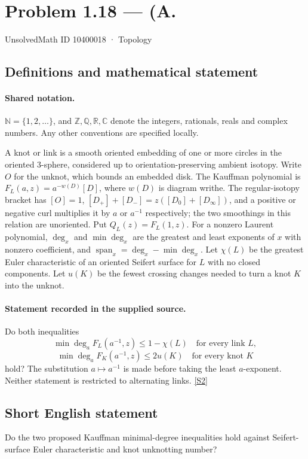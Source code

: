 \documentclass[11pt]{article}
\newcommand{\sref}[2]{\hyperlink{source:#1:#2}{[S#2]}}
\begin{document}
\setcounter{section}{10400017}
\section{Problem 1.18 — (A.}\label{10400018}
{\small\sffamily UnsolvedMath ID 10400018 · Topology}
\subsection{Definitions and mathematical statement}

\paragraph{Shared notation.}$\mathbb N=\{1,2,\ldots\}$, and $\mathbb Z,\mathbb Q,\mathbb R,\mathbb C$ denote the integers, rationals, reals and complex numbers. Any other conventions are specified locally.


A knot or link is a smooth oriented embedding of one or more circles in the oriented $3$-sphere, considered up to orientation-preserving ambient isotopy. Write $O$ for the unknot, which bounds an embedded disk. The Kauffman polynomial is $F_L(a,z)=a^{-w(D)}[D]$, where $w(D)$ is diagram writhe. The regular-isotopy bracket has $[O]=1$, $[D_+]+[D_-]=z([D_0]+[D_\infty])$, and a positive or negative curl multiplies it by $a$ or $a^{-1}$ respectively; the two smoothings in this relation are unoriented. Put $Q_L(z)=F_L(1,z)$. For a nonzero Laurent polynomial, $\deg_x$ and $\min\deg_x$ are the greatest and least exponents of $x$ with nonzero coefficient, and $\operatorname{span}_x=\deg_x-\min\deg_x$. Let $\chi(L)$ be the greatest Euler characteristic of an oriented Seifert surface for $L$ with no closed components. Let $u(K)$ be the fewest crossing changes needed to turn a knot $K$ into the unknot.
\paragraph{Statement recorded in the supplied source.}
Do both inequalities
\[\min\deg_aF_L(a^{-1},z)\le1-\chi(L)\quad\text{for every link }L,\]
\[\min\deg_aF_K(a^{-1},z)\le2u(K)\quad\text{for every knot }K\]
hold? The substitution $a\mapsto a^{-1}$ is made before taking the least $a$-exponent. Neither statement is restricted to alternating links. \sref{10400018}{2}
\subsection{Short English statement}
Do the two proposed Kauffman minimal-degree inequalities hold against Seifert-surface Euler characteristic and knot unknotting number?
\end{document}

